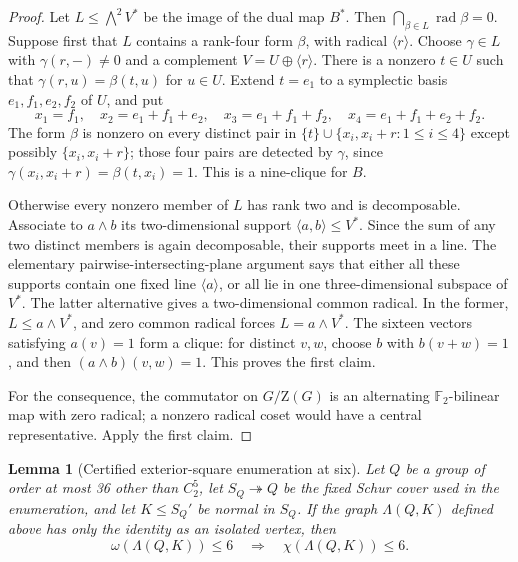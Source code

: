 \documentclass[11pt]{article}
\newtheorem{lemma}[theorem]{Lemma}
\theoremstyle{remark}
\newcommand{\F}{\mathbb F}
\newcommand{\Z}{\mathrm Z}
\begin{document}
\begin{proof}
Let $L\le\bigwedge^2V^*$ be the image of the dual map $B^*$.  Then
$\bigcap_{\beta\in L}\operatorname{rad}\beta=0$.
Suppose first that $L$ contains a rank-four form $\beta$, with radical
$\langle r\rangle$.  Choose $\gamma\in L$ with $\gamma(r,-)\ne0$ and a
complement $V=U\oplus\langle r\rangle$.  There is a nonzero $t\in U$ such
that $\gamma(r,u)=\beta(t,u)$ for $u\in U$.  Extend $t=e_1$ to a symplectic
basis $e_1,f_1,e_2,f_2$ of $U$, and put
\[
 x_1=f_1,\quad x_2=e_1+f_1+e_2,\quad
 x_3=e_1+f_1+f_2,\quad x_4=e_1+f_1+e_2+f_2.
\]
The form $\beta$ is nonzero on every distinct pair in
$\{t\}\cup\{x_i,x_i+r:1\le i\le4\}$ except possibly
$\{x_i,x_i+r\}$; those four pairs are detected by $\gamma$, since
$\gamma(x_i,x_i+r)=\beta(t,x_i)=1$.  This is a nine-clique for $B$.

Otherwise every nonzero member of $L$ has rank two and is decomposable.
Associate to $a\wedge b$ its two-dimensional support
$\langle a,b\rangle\le V^*$.  Since the sum of any two distinct members is
again decomposable, their supports meet in a line.  The elementary
pairwise-intersecting-plane argument says that either all these supports
contain one fixed line $\langle a\rangle$, or all lie in one
three-dimensional subspace of $V^*$.  The latter alternative gives a
two-dimensional common radical.  In the former, $L\le a\wedge V^*$, and
zero common radical forces $L=a\wedge V^*$.  The sixteen vectors satisfying
$a(v)=1$ form a clique: for distinct $v,w$, choose $b$ with
$b(v+w)=1$, and then $(a\wedge b)(v,w)=1$.  This proves the first claim.

For the consequence, the commutator on $G/\Z(G)$ is an alternating
$\F_2$-bilinear map with zero radical; a nonzero radical coset would have a
central representative.  Apply the first claim.
\end{proof}

\begin{lemma}[Certified exterior-square enumeration at six]
\label{lem:h6-enumeration}
Let $Q$ be a group of order at most 36 other than $C_2^5$, let
$S_Q\twoheadrightarrow Q$ be the fixed Schur cover used in the enumeration,
and let $K\le S_Q'$ be normal in $S_Q$.  If the graph $\Lambda(Q,K)$ defined
above has only the identity as an isolated vertex, then
\[
 \omega(\Lambda(Q,K))\le6\quad\Longrightarrow\quad
 \chi(\Lambda(Q,K))\le6.                                   \tag{3}
\]
\end{lemma}
\end{document}
